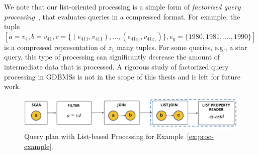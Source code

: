 We note that our list-oriented processing is a simple form of {\em factorized query processing}~\cite{fct-databases}, that evaluates queries in a compressed format. For example, the tuple  $[a=v_4, b=v_{41}, c=\{(e_{411}, v_{411}), ..., (e_{41z_1}, v_{41z_1})\}, e_y=\{1980, 1981, ...., 1990\}]$ is a compressed representation of $z_1$ many tuples. For some queries, e.g., a star query, this type of processing can significantly decrease the amount of intermediate data that is processed. A rigorous study of factorized query processing in GDBMSs is not in the scope of this thesis and is left for future work.

\begin{figure}
	\hfill\includegraphics[scale=0.78]{img/proc-lbqp}\hfill
	\vspace{-10pt}
	\caption{Query plan with List-based Processing for Example~\ref{ex:proc-example}.}
	\vspace{-8pt}
	\label{fig:proc-lbqp}
\end{figure}









